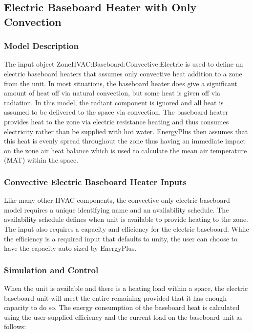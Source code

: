 \subsection{Electric Baseboard Heater with Only Convection}\label{electric-baseboard-heater-with-only-convection}

\subsubsection{Model Description}\label{model-description-1-002}

The input object ZoneHVAC:Baseboard:Convective:Electric is used to define an electric baseboard heaters that assumes only convective heat addition to a zone from the unit. In most situations, the baseboard heater does give a significant amount of heat off via natural convection, but some heat is given off via radiation. In this model, the radiant component is ignored and all heat is assumed to be delivered to the space via convection. The baseboard heater provides heat to the zone via electric resistance heating and thus consumes electricity rather than be supplied with hot water. EnergyPlus then assumes that this heat is evenly spread throughout the zone thus having an immediate impact on the zone air heat balance which is used to calculate the mean air temperature (MAT) within the space.

\subsubsection{Convective Electric Baseboard Heater Inputs}\label{convective-electric-baseboard-heater-inputs}

Like many other HVAC components, the convective-only electric baseboard model requires a unique identifying name and an availability schedule. The availability schedule defines when unit is available to provide heating to the zone. The input also requires a capacity and efficiency for the electric baseboard. While the efficiency is a required input that defaults to unity, the user can choose to have the capacity auto-sized by EnergyPlus.

\subsubsection{Simulation and Control}\label{simulation-and-control-1-000}

When the unit is available and there is a heating load within a space, the electric baseboard unit will meet the entire remaining provided that it has enough capacity to do so. The energy consumption of the baseboard heat is calculated using the user-supplied efficiency and the current load on the baseboard unit as follows:

